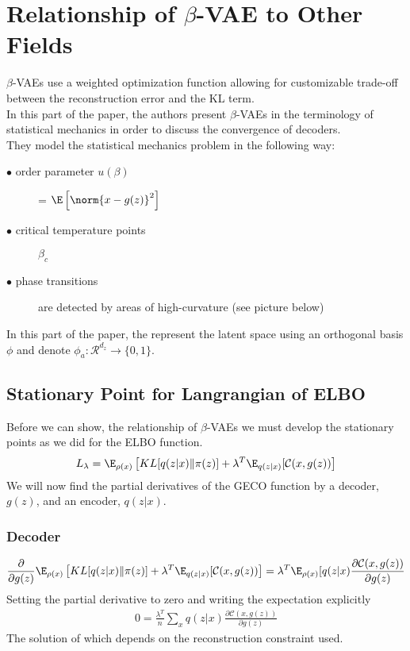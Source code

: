 \chapter*{Relationship of $\beta$-VAE to Other Fields}
$\beta$-VAEs use a weighted optimization function allowing for customizable trade-off between the reconstruction error and the KL term.\\
In this part of the paper, the authors present $\beta$-VAEs in the terminology of statistical mechanics in order to discuss the convergence of decoders.\\
They model the statistical mechanics problem in the following way:
\begin{description}
  \item[$\bullet$ order parameter $u(\beta)$] = $\E\left[\norm{x - g(z)}^2\right]$
  \item[$\bullet$ critical temperature points] $\beta_c$
  \item[$\bullet$ phase transitions] are detected by areas of high-curvature (see picture below)
\end{description}
In this part of the paper, the represent the latent space using an orthogonal basis $\phi$ and denote $\phi_a:\mathcal{R}^{d_z}\to\{0,1\}$.

\section*{Stationary Point for Langrangian of ELBO}
Before we can show, the relationship of $\beta$-VAEs we must develop the stationary points as we did for the ELBO function.
\begin{gather*}
L_{\lambda} = \E_{\rho(x)}\left[KL[q(z|x) \| \pi(z)] + \lambda^{T}\E_{q(z|x)}[\mathcal{C}(x, g(z))\right]
\end{gather*}
We will now find the partial derivatives of the GECO function by a decoder, $g(z)$, and an encoder, $q(z|x)$.\\
\subsection*{Decoder}
\begin{gather*}
\frac{\partial}{\partial g(z)}\E_{\rho(x)}\left[KL[q(z|x) \| \pi(z)] + \lambda^{T}\E_{q(z|x)}[\mathcal{C}(x, g(z))\right] = \lambda^{T}\E_{\rho(x)}[q(z|x)\frac{\partial \mathcal{C}(x, g(z))}{\partial g(z)}
\end{gather*}
Setting the partial derivative to zero and writing the expectation explicitly
\begin{gather*}
0 = \frac{\lambda^{T}}{n}\sum_{x}q(z|x)\frac{\partial \mathcal{C}(x, g(z))}{\partial g(z)}
\end{gather*}
The solution of which depends on the reconstruction constraint used.\par
